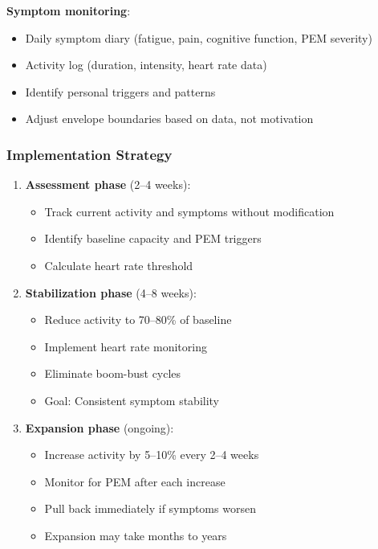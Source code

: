 \textbf{Symptom monitoring}:
\begin{itemize}
    \item Daily symptom diary (fatigue, pain, cognitive function, PEM severity)
    \item Activity log (duration, intensity, heart rate data)
    \item Identify personal triggers and patterns
    \item Adjust envelope boundaries based on data, not motivation
\end{itemize}

\subsubsection{Implementation Strategy}

\begin{enumerate}
    \item \textbf{Assessment phase} (2--4 weeks):
        \begin{itemize}
            \item Track current activity and symptoms without modification
            \item Identify baseline capacity and PEM triggers
            \item Calculate heart rate threshold
        \end{itemize}
    \item \textbf{Stabilization phase} (4--8 weeks):
        \begin{itemize}
            \item Reduce activity to 70--80\% of baseline
            \item Implement heart rate monitoring
            \item Eliminate boom-bust cycles
            \item Goal: Consistent symptom stability
        \end{itemize}
    \item \textbf{Expansion phase} (ongoing):
        \begin{itemize}
            \item Increase activity by 5--10\% every 2--4 weeks
            \item Monitor for PEM after each increase
            \item Pull back immediately if symptoms worsen
            \item Expansion may take months to years
        \end{itemize}
\end{enumerate}

